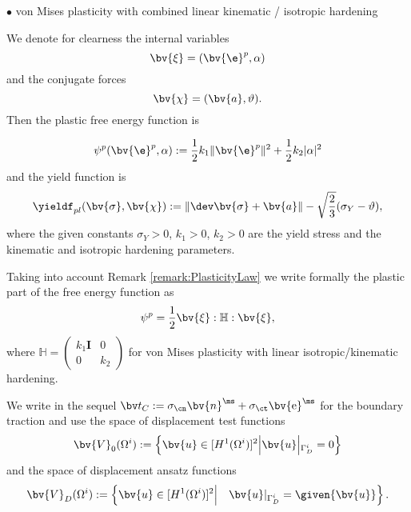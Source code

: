 \begin{remark}
\begin{enumerate}
\subitem  $\bullet$ von Mises plasticity with combined linear kinematic / isotropic hardening 

We denote for clearness the internal variables
\begin{equation} 
\bv{\xi}=(\bv{\e}^{p},\alpha)
\end{equation}
and the conjugate forces 
\begin{equation} 
\bv{\chi}=(\bv{a},\vartheta).
\end{equation}
Then the  plastic free energy function is 

\begin{equation} 
\psi^{p}(\bv{\e}^{p},\alpha):= \frac{1}{2}k_1 \|\bv{\e}^{p}\|^2 + \frac{1}{2}k_2 |\alpha|^2 
\end{equation}
and the yield function is 
\begin{equation} 
\yieldf_{pl}(\bv{\sigma},\bv{\chi}):=\|\dev \bv{\sigma}+\bv{a}\|-\sqrt{\frac{2}{3}}(\sigma_Y-\vartheta),
\end{equation}
where the given constants $\sigma_Y>0$, $k_1>0$, $k_2>0$ are the yield stress and the kinematic and isotropic hardening parameters.
\end{enumerate}
\end{remark}
Taking into account  Remark \ref{remark:PlasticityLaw} we  write formally the plastic part of the free energy function as
\begin{equation}
\psi^{p}=\frac{1}{2}\bv{\xi}:\mathbb{H}: \bv{\xi},
\end{equation}
where $\mathbb{H}=\left(\begin{array}{cc} k_1 \mathbf{I} & 0 \\ 0 & k_2 \end{array}\right)$ for von Mises plasticity with linear isotropic/kinematic hardening.  

We write in the sequel $\bv t_C := \sigma_{\cn} \bv{n}^{\ms} + \sigma_{\ct} \bv{{\mathrm e}}^{\ms}$ for the boundary traction and use the space of displacement test functions 
\begin{equation}
\bv{V}_0(\Omega^i):=\left\{\bv{u}\in [H^1(\Omega^i)]^2\middle| \bv{u}\middle|_{\Gamma^i_D}=0\right\}
\end{equation}
and the space of displacement ansatz functions
\begin{equation}
\bv{V}_D(\Omega^i):=\left\{\bv{u}\in [H^1(\Omega^i)]^2\middle| \quad \bv{u}|_{\Gamma^i_D}=\given{\bv{u}}\right\}.
\end{equation}

